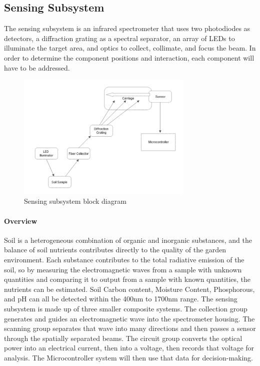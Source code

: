 \subsection{Sensing Subsystem}
\label{sec:sensing_subsystem}
The sensing subsystem is an infrared spectrometer that uses two photodiodes as detectors, a diffraction grating as a spectral separator, an array of LEDs to illuminate the target area, and optics to collect, collimate, and focus the beam. In order to determine the component positions and interaction, each component will have to be addressed.
\begin{figure}[H]
    \caption{Sensing subsystem block diagram}
    \centering
    \includegraphics[width=0.75\textwidth]{images/OpticsBlockDiagram.png}
\end{figure}


\paragraph{Overview} Soil is a heterogeneous combination of organic and inorganic substances, and the balance of soil nutrients contributes directly to the quality of the garden environment. Each substance contributes to the total radiative emission of the soil, so by measuring the electromagnetic waves from a sample with unknown quantities and comparing it to output from a sample with known quantities, the nutrients can be estimated. Soil Carbon content, Moisture Content, Phosphorous, and pH can all be detected within the 400nm to 1700nm range.
The sensing subsystem is made up of three smaller composite systems. The collection group generates and guides an electromagnetic wave into the spectrometer housing. The scanning group separates that wave into many directions and then passes a sensor through the spatially separated beams. The circuit group converts the optical power into an electrical current, then into a voltage, then records that voltage for analysis. The Microcontroller system will then use that data for decision-making.

